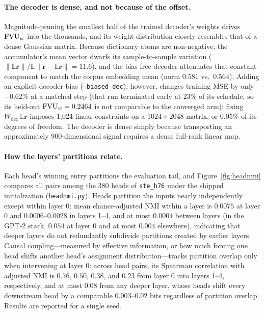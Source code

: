 \paragraph{The decoder is dense, and not because of the offset.}
Magnitude-pruning the smallest half of the trained decoder's weights
drives $\mathrm{FVU}_w$ into the thousands, and its weight distribution closely
resembles that of a dense Gaussian matrix. Because dictionary atoms are
non-negative, the accumulator's mean vector dwarfs its sample-to-sample
variation ($\lVert\mathbb{E}\mathbf{r}\rVert / \mathbb{E}\lVert
\mathbf{r}-\mathbb{E}\mathbf{r}\rVert = 11.6$), and the bias-free decoder
attenuates that constant component to match the corpus embedding mean
(norm $0.581$ vs.\ $0.564$). Adding an explicit decoder bias
(\texttt{--biased-dec}), however, changes training MSE by only $-0.62\%$
at a matched step (that run terminated early at 23\% of its schedule, so
its held-out $\mathrm{FVU}_w = 0.2464$ is not comparable to the converged arm):
fixing $W_{\mathrm{dec}}\,\mathbb{E}\mathbf{r}$ imposes 1{,}024 linear
constraints on a $1024\times2048$ matrix, or $0.05\%$ of its degrees of
freedom. The decoder is dense simply because transporting an
approximately 900-dimensional signal requires a dense full-rank linear
map.

\paragraph{How the layers' partitions relate.} Each head's winning entry
partitions the evaluation tail, and Figure~\ref{fig:headnmi} compares all
pairs among the 380 heads of \texttt{ste\_h76} under the shipped
initialization (\texttt{headnmi.py}). Heads partition the inputs nearly
independently except within layer 0: mean chance-adjusted NMI within a
layer is $0.0075$ at layer 0 and $0.0006$--$0.0028$ in layers 1--4, and
at most $0.0004$ between layers (in the GPT-2 stack, $0.054$ at layer 0
and at most $0.004$ elsewhere), indicating that deeper layers do not
redundantly subdivide partitions created by earlier layers. Causal
coupling---measured by effective information, or how much forcing one head
shifts another head's assignment distribution---tracks partition overlap
only when intervening at layer 0: across head pairs, its Spearman
correlation with adjusted NMI is $0.76$, $0.50$, $0.38$, and $0.23$ from
layer 0 into layers 1--4, respectively, and at most $0.08$ from any
deeper layer, whose heads shift every downstream head by a comparable
$0.003$--$0.02$ bits regardless of partition overlap. Results are reported
for a single seed.

